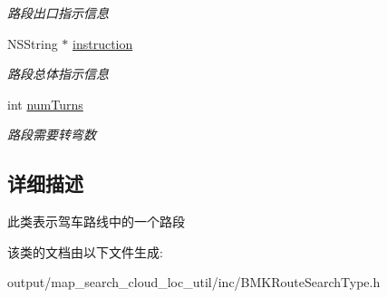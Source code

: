 \begin{DoxyCompactItemize}
\begin{DoxyCompactList}\small\item\em 路段出口指示信息 \end{DoxyCompactList}\item 
\hypertarget{interface_b_m_k_driving_step_a70a35973fdc204236c21d44770014989}{N\+S\+String $\ast$ \hyperlink{interface_b_m_k_driving_step_a70a35973fdc204236c21d44770014989}{instruction}}\label{interface_b_m_k_driving_step_a70a35973fdc204236c21d44770014989}

\begin{DoxyCompactList}\small\item\em 路段总体指示信息 \end{DoxyCompactList}\item 
\hypertarget{interface_b_m_k_driving_step_a261507960f7fcf3b6981e9a31667f47c}{int \hyperlink{interface_b_m_k_driving_step_a261507960f7fcf3b6981e9a31667f47c}{num\+Turns}}\label{interface_b_m_k_driving_step_a261507960f7fcf3b6981e9a31667f47c}

\begin{DoxyCompactList}\small\item\em 路段需要转弯数 \end{DoxyCompactList}\end{DoxyCompactItemize}


\subsection{详细描述}
此类表示驾车路线中的一个路段 

该类的文档由以下文件生成\+:\begin{DoxyCompactItemize}
\item 
output/map\+\_\+search\+\_\+cloud\+\_\+loc\+\_\+util/inc/B\+M\+K\+Route\+Search\+Type.\+h\end{DoxyCompactItemize}
